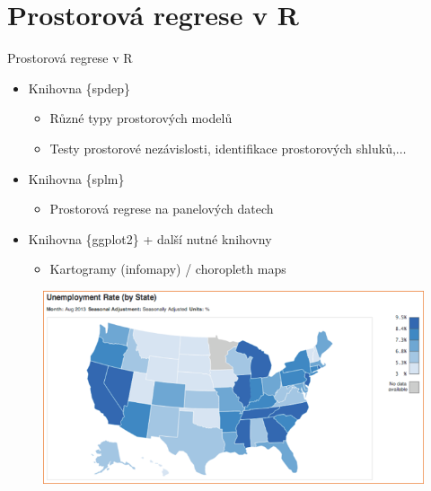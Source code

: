 \documentclass{beamer}
\begin{document}
\section{Prostorová regrese v R}
\begin{frame}{Prostorová regrese v R}
\begin{itemize}
	\item Knihovna \{spdep\} 
	\begin{itemize}
		\item Různé typy prostorových modelů
		\item Testy prostorové nezávislosti, identifikace prostorových shluků,$\dots$
	\end{itemize}
	\item	Knihovna \{splm\}
	\begin{itemize}
		\item Prostorová regrese na panelových datech
	\end{itemize}
	\item Knihovna \{ggplot2\} + další nutné knihovny
	\begin{itemize}
		\item Kartogramy (infomapy) / choropleth maps
	\end{itemize}
\end{itemize}
 \begin{figure}
 	\includegraphics[width=.5\textwidth]{IMG/sp_unemp.PNG}
 \end{figure}

\end{frame}

\end{document}
